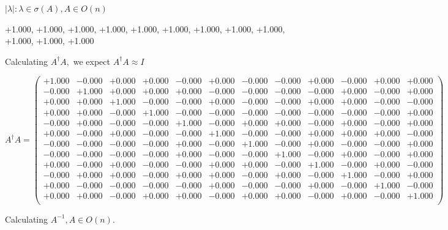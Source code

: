 \documentclass[9pt]{article}
\theoremstyle{plain}
\theoremstyle{definition}
\theoremstyle{remark}
\numberwithin{equation}{section}
\begin{document}
 $|\lambda | : \lambda \in \sigma(A) , A \in O(n)$

+1.000, +1.000, +1.000, +1.000, +1.000, +1.000, +1.000, +1.000, +1.000, +1.000, +1.000, +1.000


Calculating $A^{\dag} A,$  we expect $A^{\dag} A \approx I$

$A^{\dag} A = \left(
\begin{array}{
cccccccccccc}
+1.000 & -0.000 & +0.000 & +0.000 & -0.000 & +0.000 & -0.000 & -0.000 & +0.000 & -0.000 & +0.000 & +0.000 \\
-0.000 & +1.000 & +0.000 & +0.000 & +0.000 & -0.000 & -0.000 & -0.000 & -0.000 & +0.000 & -0.000 & +0.000 \\
+0.000 & +0.000 & +1.000 & -0.000 & -0.000 & +0.000 & -0.000 & -0.000 & +0.000 & +0.000 & -0.000 & -0.000 \\
+0.000 & +0.000 & -0.000 & +1.000 & -0.000 & -0.000 & -0.000 & -0.000 & -0.000 & -0.000 & -0.000 & +0.000 \\
-0.000 & +0.000 & -0.000 & -0.000 & +1.000 & -0.000 & +0.000 & +0.000 & -0.000 & +0.000 & -0.000 & +0.000 \\
+0.000 & -0.000 & +0.000 & -0.000 & -0.000 & +1.000 & -0.000 & -0.000 & +0.000 & +0.000 & +0.000 & -0.000 \\
-0.000 & -0.000 & -0.000 & -0.000 & +0.000 & -0.000 & +1.000 & -0.000 & +0.000 & -0.000 & -0.000 & +0.000 \\
-0.000 & -0.000 & -0.000 & -0.000 & +0.000 & -0.000 & -0.000 & +1.000 & -0.000 & +0.000 & -0.000 & +0.000 \\
+0.000 & -0.000 & +0.000 & -0.000 & -0.000 & +0.000 & +0.000 & -0.000 & +1.000 & -0.000 & +0.000 & -0.000 \\
-0.000 & +0.000 & +0.000 & -0.000 & +0.000 & +0.000 & -0.000 & +0.000 & -0.000 & +1.000 & -0.000 & +0.000 \\
+0.000 & -0.000 & -0.000 & -0.000 & -0.000 & +0.000 & -0.000 & -0.000 & +0.000 & -0.000 & +1.000 & -0.000 \\
+0.000 & +0.000 & -0.000 & +0.000 & +0.000 & -0.000 & +0.000 & +0.000 & -0.000 & +0.000 & -0.000 & +1.000 \\
\end{array}
\right)$ \newline 

Calculating $A^{-1} ,  A \in O(n)$.
\end{document}
